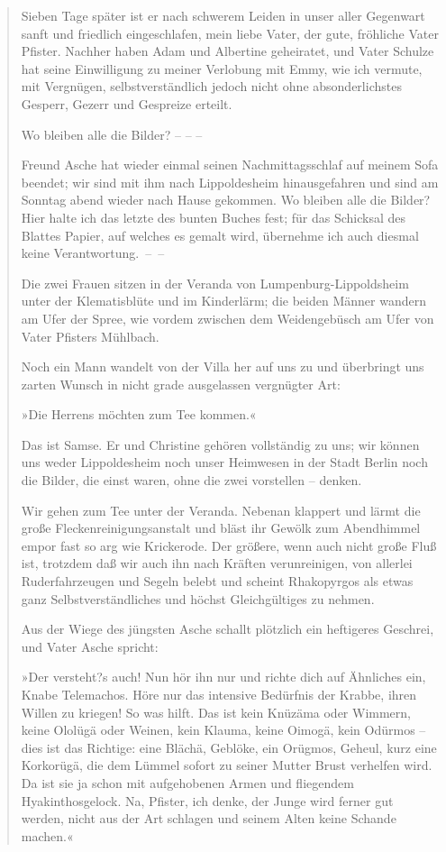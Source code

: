 \begin{verse}
Sieben Tage später ist er nach schwerem Leiden in unser aller
Gegenwart sanft und friedlich eingeschlafen, mein liebe Vater, der
gute, fröhliche Vater Pfister. Nachher haben Adam und Albertine
geheiratet, und Vater Schulze hat seine Einwilligung zu meiner
Verlobung mit Emmy, wie ich vermute, mit Vergnügen,
selbstverständlich jedoch nicht ohne absonderlichstes Gesperr,
Gezerr und Gespreize erteilt.

Wo bleiben alle die Bilder? – – –

Freund Asche hat wieder einmal seinen Nachmittagsschlaf auf meinem
Sofa beendet; wir sind mit ihm nach Lippoldesheim hinausgefahren
und sind am Sonntag abend wieder nach Hause gekommen. Wo bleiben
alle die Bilder? Hier halte ich das letzte des bunten Buches fest;
für das Schicksal des Blattes Papier, auf welches es gemalt wird,
übernehme ich auch diesmal keine Verantwortung.~–~–

Die zwei Frauen sitzen in der Veranda von Lumpenburg-Lippoldsheim
unter der Klematisblüte und im Kinderlärm; die beiden Männer
wandern am Ufer der Spree, wie vordem zwischen dem Weidengebüsch am
Ufer von Vater Pfisters Mühlbach.

Noch ein Mann wandelt von der Villa her auf uns zu und überbringt
uns zarten Wunsch in nicht grade ausgelassen vergnügter Art:

»Die Herrens möchten zum Tee kommen.«

Das ist Samse. Er und Christine gehören vollständig zu uns; wir
können uns weder Lippoldesheim noch unser Heimwesen in der Stadt
Berlin noch die Bilder, die einst waren, ohne die zwei vorstellen –
denken.

Wir gehen zum Tee unter der Veranda. Nebenan klappert und lärmt die
große Fleckenreinigungsanstalt und bläst ihr Gewölk zum Abendhimmel
empor fast so arg wie Krickerode. Der größere, wenn auch nicht
große Fluß ist, trotzdem daß wir auch ihn nach Kräften
verunreinigen, von allerlei Ruderfahrzeugen und Segeln belebt und
scheint Rhakopyrgos als etwas ganz Selbstverständliches und höchst
Gleichgültiges zu nehmen.

Aus der Wiege des jüngsten Asche schallt plötzlich ein heftigeres
Geschrei, und Vater Asche spricht:

»Der versteht?s auch! Nun hör ihn nur und richte dich auf Ähnliches
ein, Knabe Telemachos. Höre nur das intensive Bedürfnis der Krabbe,
ihren Willen zu kriegen! So was hilft. Das ist kein Knüzäma oder
Wimmern, keine Ololügä oder Weinen, kein Klauma, keine Oimogä, kein
Odürmos – dies ist das Richtige: eine Blächä, Geblöke, ein Orügmos,
Geheul, kurz eine Korkorügä, die dem Lümmel sofort zu seiner Mutter
Brust verhelfen wird. Da ist sie ja schon mit aufgehobenen Armen
und fliegendem Hyakinthosgelock. Na, Pfister, ich denke, der Junge
wird ferner gut werden, nicht aus der Art schlagen und seinem Alten
keine Schande machen.«


\end{verse}
